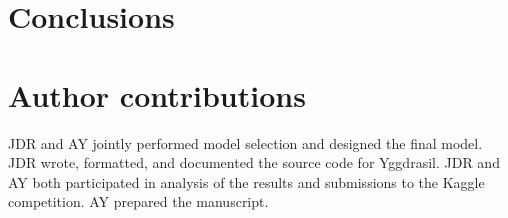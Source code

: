 \documentclass[11pt,a4paper]{article}
\begin{document}
\section{Conclusions}

\section{Author contributions}
JDR and AY jointly performed model selection and designed the final model. JDR wrote, formatted, and documented the source code for Yggdrasil. JDR and AY both participated in analysis of the results and submissions to the Kaggle competition. AY prepared the manuscript.
\end{document}
